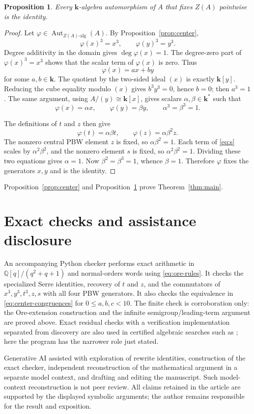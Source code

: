 \documentclass[11pt]{article}
\newtheorem{proposition}[theorem]{Proposition}
\newcommand{\Aut}{\operatorname{Aut}}
\newcommand{\kk}{\mathbf{k}}
\begin{document}
\begin{proposition}\label{prop:ozone}
Every $\kk$-algebra automorphism of $A$ that fixes $Z(A)$ pointwise is the
identity.
\end{proposition}

\begin{proof}
Let $\varphi\in\Aut_{Z(A)\text{-alg}}(A)$.  By
Proposition~\ref{prop:center},
\[
 \varphi(x)^3=x^3,
 \qquad
 \varphi(y)^3=y^3.
\]
Degree additivity in the domain gives $\deg\varphi(x)=1$.  The degree-zero
part of $\varphi(x)^3=x^3$ shows that the scalar term of $\varphi(x)$ is
zero.  Thus
\[
 \varphi(x)=a x+b y
\]
for some $a,b\in\kk$.  The quotient by the two-sided ideal $(x)$ is exactly
$\kk[y]$.  Reducing the cube equality modulo $(x)$ gives $b^3y^3=0$, hence
$b=0$; then $a^3=1$.  The same argument, using
$A/(y)\cong\kk[x]$, gives scalars $\alpha,\beta\in\kk^*$ such that
\begin{equation}
 \varphi(x)=\alpha x,
 \qquad
 \varphi(y)=\beta y,
 \qquad
 \alpha^3=\beta^3=1.
 \label{eq:diagonal}
\end{equation}

The definitions of $t$ and $z$ then give
\[
 \varphi(t)=\alpha\beta t,
 \qquad
 \varphi(z)=\alpha\beta^2 z.
\]
The nonzero central PBW element $z$ is fixed, so
$\alpha\beta^2=1$.  Each term of \eqref{eq:s} scales by
$\alpha^2\beta^2$, and the nonzero element $s$ is fixed, so
$\alpha^2\beta^2=1$.  Dividing these two equations gives $\alpha=1$.
Now $\beta^2=\beta^3=1$, whence $\beta=1$.  Therefore $\varphi$ fixes the
generators $x,y$ and is the identity.
\end{proof}

Proposition~\ref{prop:center} and Proposition~\ref{prop:ozone} prove
Theorem~\ref{thm:main}.

\section{Exact checks and assistance disclosure}

An accompanying Python checker performs exact arithmetic in
$\mathbb{Q}[q]/(q^2+q+1)$ and normal-orders words using
\eqref{eq:ore-rules}.  It checks the specialized Serre identities, recovery
of $t$ and $z$, and the commutators of $x^3,y^3,t^3,z,s$ with all four PBW
generators.  It also checks the equivalence in
\eqref{eq:center-congruences} for $0\leq a,b,c<10$.  The finite check is
corroboration only: the Ore-extension construction and the infinite
semigroup/leading-term argument are proved above.  Exact residual checks
with a verification implementation separated from discovery are also used
in certified algebraic searches such as \cite{Zeng2026UMTC}; here the
program has the narrower role just stated.

Generative AI assisted with exploration of rewrite identities, construction
of the exact checker, independent reconstruction of the mathematical
argument in a separate model context, and drafting and editing the
manuscript.  Such model-context reconstruction is not peer review.  All
claims retained in the article are supported by the displayed symbolic
arguments; the author remains responsible for the result and exposition.



\end{document}

